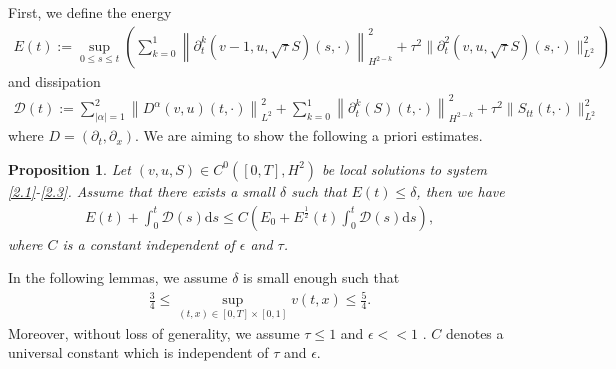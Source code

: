 \documentclass[10pt,reqno]{amsart}
\numberwithin{equation}{section}
\newtheorem{proposition}[theorem]{Proposition}
\newcommand{\dif}{\mathrm{d}}
\newcommand{\SUM}[3]{\sum\limits_{{#1}={#2}}^{#3}}
\begin{document}
First, we define the energy 
\begin{align} \label{3.1}
E(t):=\sup_{0\leq s \leq t} \left(\SUM k 0 1 \left\|\partial_t^k(v-1, u, \sqrt{\tau  }S) (s, \cdot)\right\|_{H^{2-k}}^{2}+\tau^2 \| \partial_t^2 (v, u,  \sqrt{\tau} S)(s, \cdot)\|_{L^2}^2\right)
\end{align}
and dissipation
\begin{align}\label{3.2}
\mathcal{D}(t):=\sum_{|\alpha|=1}^{2}\left\|D^{\alpha}(v,u) (t, \cdot)\right\|_{L^{2}}^{2}+ \SUM k 0 1 \left\|\partial_t^k(S)(t, \cdot)\right\|_{H^{2-k}}^{2}+\tau^2 \| S_{tt}(t, \cdot)\|_{L^2}^2
\end{align}
where $D=(\partial_t, \partial_x)$.  We are aiming to show the following a priori estimates.
\begin{proposition}\label{Prop3.1}
Let $(v, u, S)\in C^0([0,T], H^2)$ be local solutions to system \eqref{2.1}-\eqref{2.3}.  Assume that there exists  a small $\delta$ such that $E(t)\le \delta$, then  we have
\begin{align}\label{3.3}
E(t)+\int_0^t \mathcal D(s)\dif s \le C \left(E_0+E^\frac{1}{2}(t) \int_0^t \mathcal D(s)\dif s\right),
\end{align}
where $C$ is a constant independent of $\epsilon$ and $\tau$.
\end{proposition}
In the following lemmas, we  assume $\delta$ is small enough such that
\begin{align}\label{3.4}
\frac{3}{4}\le \sup_{(t, x)\in[0,T]\times[0,1]}v(t,x) \le \frac{5}{4}.
\end{align}
Moreover, without loss of generality, we assume $\tau\le 1$ and $\epsilon<<1$ . $C$ denotes a universal constant which is independent of $\tau$ and $\epsilon$. 
\end{document}
